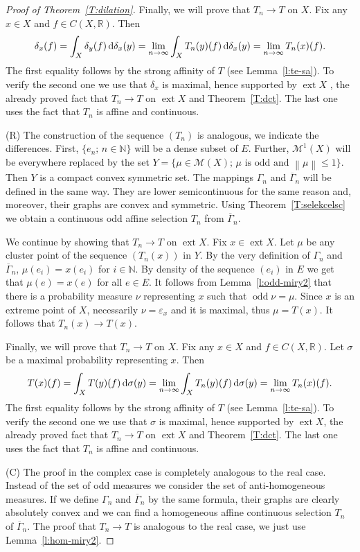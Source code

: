 \documentclass{amsart}
\numberwithin{equation}{section}
\theoremstyle{definition}
\def\M{\mathcal M}
\def\ep{\varepsilon}
\def\en{\mathbb N}
\def\er{\mathbb R}
\def\ov{\overline}
\def \ext {\operatorname{ext}}
\def\odd{\operatorname{odd}}
\def\di{\,\mbox{\rm d}}
\newcommand{\norm}[1]{\left\|#1\right\|}
\newcommand{\setsep}{;\,}
\begin{document}
\begin{proof}[Proof of Theorem~\ref{T:dilation}]
Finally, we will prove that $T_n\to T$ on $X$. Fix any $x\in X$ and $f\in C(X,\er)$.
Then
$$\delta_x(f)=\int_X \delta_y(f)\di\delta_x(y)=\lim_{n\to\infty} \int_X T_n(y)(f)\di\delta_x(y)=\lim_{n\to\infty} T_n(x)(f).$$
The first equality follows by the strong affinity of $T$ (see Lemma~\ref{l:te-sa}). To verify the second one we use that $\delta_x$ is maximal, hence supported by $\ext X$ ,
the already proved fact that $T_n\to T$ on $\ext X$ and Theorem~\ref{T:dct}. The last one uses the fact that $T_n$ is affine and continuous.

(R) The construction of the sequence $(T_n)$ is analogous, we indicate the differences.
First, $\{e_n\setsep n\in\en\}$ will be a dense subset of $E$. Further, $\M^1(X)$ will be everywhere replaced by the set
$Y=\{\mu\in \M(X)\setsep\mu\mbox{ is odd and }\norm{\mu}\le 1\}$. Then $Y$ is a compact convex symmetric set.
The mappings $\Gamma_n$ and $\ov{\Gamma}_n$ will be defined in the same way. They are lower semicontinuous for the same reason and, moreover, their graphs are convex and symmetric.
Using Theorem~\ref{T:selekcelsc} we obtain a continuous odd affine selection $T_n$ from $\ov{\Gamma}_n$.

We continue by showing that $T_n\to T$ on $\ext X$. Fix $x\in \ext X$. Let $\mu$ be any cluster point of the sequence $(T_n(x))$ in $Y$. By the very definition of $\Gamma_n$ and $\ov{\Gamma}_n$, $\mu(e_i)=x(e_i)$ for $i\in\en$. By density of the sequence $(e_i)$ in $E$ we get that $\mu(e)=x(e)$ for all $e\in E$. It follows from Lemma~\ref{l:odd-miry2} that there is a probability measure $\nu$ representing $x$ such that $\odd\nu=\mu$. Since $x$ is an extreme point of $X$, necessarily $\nu=\ep_{x}$ and it is maximal, thus $\mu=T(x)$. It follows that $T_n(x)\to T(x)$.

Finally, we will prove that $T_n\to T$ on $X$. Fix any $x\in X$ and $f\in C(X,\er)$.
Let $\sigma$ be a maximal probability representing $x$. Then
$$T(x)(f)=\int_X T(y)(f)\di\sigma(y)=\lim_{n\to\infty} \int_X T_n(y)(f)\di\sigma(y)=\lim_{n\to\infty} T_n(x)(f).$$
The first equality follows by the strong affinity of $T$ (see Lemma~\ref{l:te-sa}). To verify the second one we use that $\sigma$ is maximal, hence supported by $\ext X$,  the already proved fact that $T_n\to T$ on $\ext X$ and Theorem~\ref{T:dct}. The last one uses the fact that $T_n$ is affine and continuous.


(C) The proof in the complex case is completely analogous to the real case. Instead of the set of odd measures we consider the set of anti-homogeneous measures. If we define $\Gamma_n$ and $\ov{\Gamma}_n$ by the same formula, their graphs are clearly absolutely convex and we can find a homogeneous affine continuous selection $T_n$ of $\ov{\Gamma}_n$.
The proof that $T_n\to T$ is analogous to the real case, we just use Lemma~\ref{l:hom-miry2}.
\end{proof}
\end{document}
